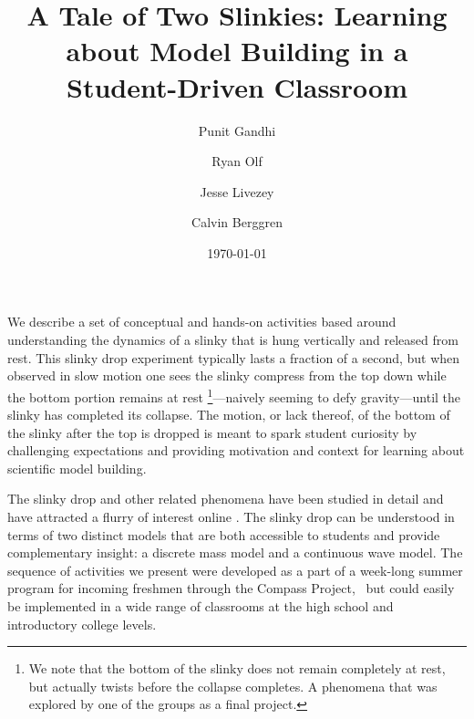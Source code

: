 \documentclass[pre,preprint,superscriptaddress,longbibliography]{revtex4-1}
\begin{document}
\title{A Tale of Two Slinkies: Learning about Model Building in a Student-Driven Classroom}
\author{Punit  Gandhi}
\author{Ryan Olf}
\author{Jesse Livezey}
\author{Calvin Berggren}
\date{\today}

\maketitle

We describe a set of conceptual  and hands-on activities based around understanding the dynamics of a slinky that is hung vertically and released from rest.  
This slinky drop experiment typically lasts a fraction of a second, but when observed in slow motion one sees the slinky compress from the top down while the bottom portion remains at rest \footnote{We note that the bottom of the slinky does not remain completely at rest, but actually twists before the collapse completes.  A phenomena that was explored by one of the groups as a final project.}---naively seeming to defy gravity---until the slinky has completed its collapse.  The motion, or lack thereof, of the bottom of the slinky after the top is dropped is meant to spark student curiosity by challenging  expectations and providing motivation and context for learning about scientific model building. 



The slinky drop  and other related phenomena have been studied in detail\cite{calkin1993, newburgh1995, graham2001, aguirregabiria2007,unruh2011, cross2012} and have attracted a flurry of interest online \cite{veretasium2012}. The slinky drop  can be understood in terms of two distinct models that are both accessible to students and provide complementary insight: a discrete mass model and a continuous wave model.  
 The sequence of activities we present were developed as a part of a week-long summer program for incoming freshmen through the Compass Project,~\cite{albana2013,roth2012,drdf2013a,drdf2013b,gandhi2014} but could easily be implemented in a wide range of classrooms at the high school and introductory college levels.   %
\end{document}
